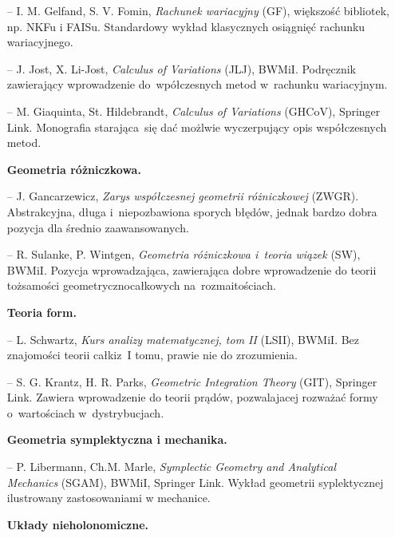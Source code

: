 \documentclass[a4paper,11pt]{article}
\begin{document}
\begin{itemize}
\item[--] I. M. Gelfand, S. V. Fomin, \emph{Rachunek wariacyjny} (GF),
  większość bibliotek, np. NKFu i FAISu. Standardowy wykład
  klasycznych osiągnięć rachunku wariacyjnego.

\item[--] J. Jost, X. Li-Jost, \emph{Calculus of Variations} (JLJ),
  BWMiI. Podręcznik zawierający wprowadzenie do~wpółczesnych metod
  w~rachunku wariacyjnym.

\item[--] M. Giaquinta, St. Hildebrandt, \emph{Calculus of Variations}
  (GHCoV), Springer Link. Monografia starająca~się dać możlwie
  wyczerpujący opis współczesnych metod.


\item[] \textbf{Geometria różniczkowa.}

\item[--] J. Gancarzewicz, \emph{Zarys współczesnej geometrii
    różniczkowej} (ZWGR). Abstrakcyjna, długa i~niepozbawiona sporych
  błędów, jednak bardzo dobra pozycja dla średnio zaawansowanych.

\item[--] R. Sulanke, P. Wintgen, \emph{Geometria różniczkowa i~teoria
    wiązek} (SW), BWMiI. Pozycja wprowadzająca, zawierająca dobre
  wprowadzenie do teorii tożsamości geometryczno\dywiz całkowych
  na~rozmaitościach.


\item[] \textbf{Teoria form.}

\item[--] L. Schwartz, \emph{Kurs analizy matematycznej, tom II}
  (LSII), BWMiI. Bez znajomości teorii całki\linebreak z~I tomu,
  prawie nie do zrozumienia.

\item[--] S. G. Krantz, H. R. Parks, \emph{Geometric Integration
    Theory} (GIT), Springer Link. Zawiera wprowadzenie do teorii
  prądów, pozwalajacej rozważać formy o~wartościach w~dystrybucjach.
\item[] \textbf{Geometria symplektyczna i mechanika.}

\item[--] P. Libermann, Ch.\dywiz M. Marle, \emph{Symplectic Geometry
    and Analytical Mechanics} (SGAM), BWMiI, Springer Link. Wykład
  geometrii syplektycznej ilustrowany zastosowaniami w mechanice.


  \newpage
\item[] \textbf{Układy nieholonomiczne.}


\end{itemize}
\end{document}
